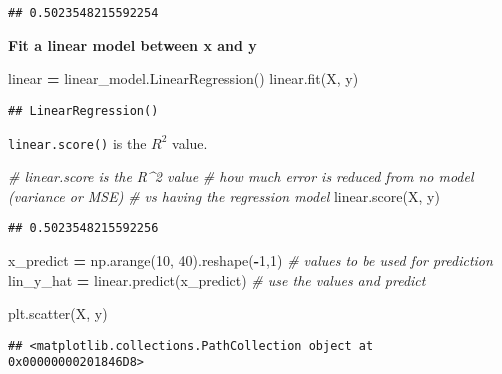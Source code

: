 \documentclass[
]{book}
\newenvironment{Shaded}{\begin{snugshade}}{\end{snugshade}}
\newcommand{\CommentTok}[1]{\textcolor[rgb]{0.56,0.35,0.01}{\textit{#1}}}
\newcommand{\DecValTok}[1]{\textcolor[rgb]{0.00,0.00,0.81}{#1}}
\newcommand{\NormalTok}[1]{#1}
\newcommand{\OperatorTok}[1]{\textcolor[rgb]{0.81,0.36,0.00}{\textbf{#1}}}
\begin{document}
\begin{verbatim}
## 0.5023548215592254
\end{verbatim}

\textbf{Fit a linear model between x and y}

\begin{Shaded}
\begin{Highlighting}[]
\NormalTok{linear }\OperatorTok{=}\NormalTok{ linear\_model.LinearRegression()}
\NormalTok{linear.fit(X, y)}
\end{Highlighting}
\end{Shaded}

\begin{verbatim}
## LinearRegression()
\end{verbatim}

\texttt{linear.score()} is the \(R^2\) value.

\begin{Shaded}
\begin{Highlighting}[]
\CommentTok{\# linear.score is the R\^{}2 value}
\CommentTok{\# how much error is reduced from no model (variance or MSE)}
\CommentTok{\# vs having the regression model}
\NormalTok{linear.score(X, y)}
\end{Highlighting}
\end{Shaded}

\begin{verbatim}
## 0.5023548215592256
\end{verbatim}

\begin{Shaded}
\begin{Highlighting}[]
\NormalTok{x\_predict }\OperatorTok{=}\NormalTok{ np.arange(}\DecValTok{10}\NormalTok{, }\DecValTok{40}\NormalTok{).reshape(}\OperatorTok{{-}}\DecValTok{1}\NormalTok{,}\DecValTok{1}\NormalTok{) }\CommentTok{\# values to be used for prediction}
\NormalTok{lin\_y\_hat }\OperatorTok{=}\NormalTok{ linear.predict(x\_predict) }\CommentTok{\# use the values and predict}
\end{Highlighting}
\end{Shaded}

\begin{Shaded}
\begin{Highlighting}[]
\NormalTok{plt.scatter(X, y)}
\end{Highlighting}
\end{Shaded}

\begin{verbatim}
## <matplotlib.collections.PathCollection object at 0x00000000201846D8>
\end{verbatim}
\end{document}

